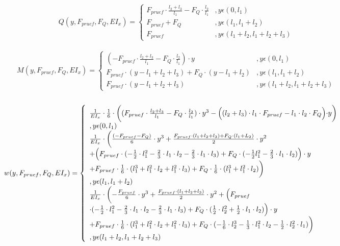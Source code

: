 \begin{equation}\label{eq:34}
	Q(y,F_{pruef},F_{Q},EI_{x})=\left\{\begin{array}{ll}
		F_{pruef}\cdot \frac{l_{2}+l_{3}}{l_{1}}-F_{Q}\cdot \frac{l_{2}}{l_{1}}&,y\epsilon (0,l_{1})\\
		F_{pruef}+F_{Q}&,y\epsilon (l_{1}, l_{1}+l_{2})\\
		F_{pruef}&,y\epsilon (l_{1}+l_{2}, l_{1}+l_{2}+l_{3})
	\end{array}\right.
\end{equation}\\
\begin{equation}\label{eq:35}
	M(y,F_{pruef},F_{Q},EI_{x})=\left\{\begin{array}{ll}
		(-F_{pruef}\cdot \frac{l_{2}+l_{3}}{l_{1}}-F_{Q}\cdot \frac{l_{2}}{l_{1}})\cdot y&,y\epsilon (0,l_{1})\\
		F_{pruef}\cdot (y-l_{1}+l_{2}+l_{3})+F_{Q}\cdot (y-l_{1}+l_{2})&,y\epsilon (l_{1}, l_{1}+l_{2})\\
		F_{pruef}\cdot (y-l_{1}+l_{2}+l_{3})&,y\epsilon (l_{1}+l_{2}, l_{1}+l_{2}+l_{3})
	\end{array}\right.
\end{equation}\\
\begin{equation}\label{eq:36}
	w(y,F_{pruef},F_{Q},EI_{x})=\left\{\begin{array}{ll}
		\frac{1}{EI_{x}}\cdot\frac{1}{6}\cdot\biggl((F_{pruef}\cdot \frac{l_{2}+l_{3}}{l_{1}}-F_{Q}\cdot \frac{l_{2}}{l_{1}})\cdot y^{3}-\Bigl((l_{2}+l_{3})\cdot l_{1}\cdot F_{pruef}-l_{1}\cdot l_{2}\cdot F_{Q}\Bigl)\cdot y \biggr)&\\,y\epsilon (0,l_{1})\\
		\frac{1}{EI_{x}}\cdot\biggl(\frac{(-F_{pruef}-F_{Q})}{6}\cdot y^{3} + \frac{F_{pruef}\cdot (l_{1}+l_{2}+l_{3})+F_{Q}\cdot (l_{1}+L_{2})}{2}\cdot y^{2}\\ + \Bigl(F_{pruef}\cdot(-\frac{1}{2}\cdot l_{1}^{2}-\frac{2}{3}\cdot l_{1}\cdot l_{2}-\frac{2}{3}\cdot l_{1}\cdot l_{3})+ F_{Q}\cdot(-\frac{1}{2}l_{1}^{2}-\frac{2}{3}\cdot l_{1}\cdot l_{2})\Bigr)\cdot y \\+ F_{pruef}\cdot\frac{1}{6}\cdot(l_{1}^{3}+l_{1}^{2}\cdot l_{2}+l_{1}^{2}\cdot l_{3}) + F_{Q}\cdot\frac{1}{6}\cdot(l_{1}^{3}+l_{1}^{2}\cdot l_{2})\biggr)&\\,y\epsilon (l_{1}, l_{1}+l_{2})\\
		\frac{1}{EI_{x}}\cdot\biggl(-\frac{F_{pruef}}{6}\cdot y^{3} + \frac{ F_{pruef}\cdot (l_{1}+l_{2}+l_{3})}{2}\cdot y^{2} + \Bigl(F_{pruef} \\
		\cdot(-\frac{1}{2}\cdot l_{1}^{2} -\frac{2}{3}\cdot l_{1}\cdot l_{2}-\frac{2}{3}\cdot l_{1}\cdot l_{3}) + F_{Q}\cdot(\frac{1}{2}\cdot l_{2}^{2}+\frac{1}{2}\cdot l_{1}\cdot l_{2})\Bigr)\cdot y \\ +F_{pruef}\cdot\frac{1}{6}\cdot(l_{1}^{3}+l_{1}^{2}\cdot l_{2}+l_{1}^{2}\cdot l_{3}) + F_{Q}\cdot(-\frac{1}{6}\cdot l_{2}^{3}-\frac{1}{3}\cdot l_{1}^{2}\cdot l_{2}-\frac{1}{2}\cdot l_{2}^{2}\cdot l_{1})\biggr)&\\,y\epsilon (l_{1}+l_{2}, l_{1}+l_{2}+l_{3})
	\end{array}\right.
\end{equation}\\
